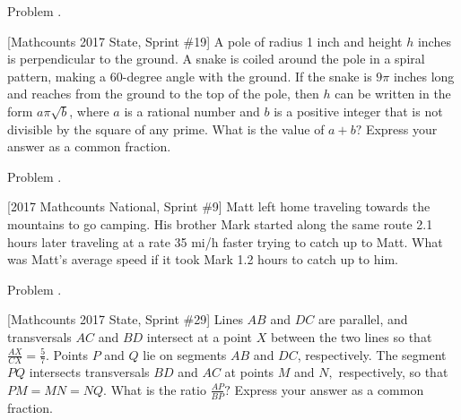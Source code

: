 \documentclass[9pt]{beamer}
\newcounter{problem}[section]
\begin{document}
\begin{frame}[t, fragile]{Problem \thesection.\theproblem}
    \begin{block}{}[Mathcounts 2017 State, Sprint \#19]
A pole of radius 1 inch and height $h$ inches is perpendicular to the ground. A
snake is coiled around the pole in a spiral pattern, making a 60-degree angle
with the ground. If the snake is $9\pi$ inches long and reaches from the ground to the top of the pole, then $h$ can be written in the form $a \pi \sqrt{b}$, where $a$ is a rational
number and $b$ is a positive integer that is not divisible by the square of any
prime. What is the value of $a + b?$ Express your answer as a common fraction.
    
    \end{block}
\end{frame}


\begin{frame}[t, fragile]{Problem \thesection.\theproblem}
    \begin{block}{}[2017 Mathcounts National, Sprint \#9]
    Matt left home traveling towards the mountains to go camping. His brother Mark started along the same route 2.1 hours later traveling at a rate 35 mi/h faster trying to catch up to Matt. What was Matt's average speed if it took Mark 1.2 hours to catch up to him.
    
    
    \end{block}
\end{frame}

\begin{frame}[t, fragile]{Problem \thesection.\theproblem}
    \begin{block}{}[Mathcounts 2017 State, Sprint \#29]
Lines $AB$ and $DC$ are parallel, and transversals $AC$ and $BD$ intersect at a point $X$ between the two lines so that $\frac{AX}{CX} = \frac{5}{7}.$ Points $P$ and $Q$ lie on segments $AB$ and $DC$, respectively. The segment $PQ$ intersects transversals $BD$ and $AC$ at points $M$ and $N,$ respectively, so that $PM = MN = NQ.$ What is the ratio $\frac{AP}{BP}?$ Express your answer as a common fraction.	
    
    \end{block}
\end{frame}
\end{document}

